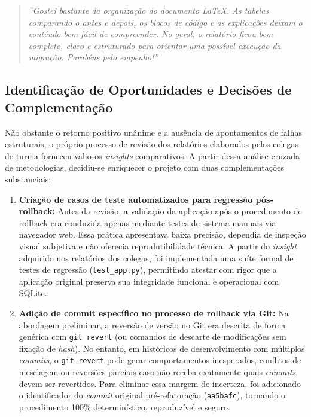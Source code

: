 \documentclass[12pt,a4paper]{article}
\begin{document}
\begin{quote}
\textit{``Gostei bastante da organização do documento LaTeX. As tabelas comparando o
antes e depois, os blocos de código e as explicações deixam o contéudo bem fácil de
compreender. No geral, o relatório ficou bem completo, claro e estruturado para
orientar uma possível execução da migração. Parabéns pelo empenho!''}
\end{quote}

\subsection{Identificação de Oportunidades e Decisões de Complementação}

Não obstante o retorno positivo unânime e a ausência de apontamentos de falhas estruturais,
o próprio processo de revisão dos relatórios elaborados pelos colegas de turma forneceu
valiosos \textit{insights} comparativos. A partir dessa análise cruzada de metodologias,
decidiu-se enriquecer o projeto com duas complementações substanciais:

\begin{enumerate}
  \item \textbf{Criação de casos de teste automatizados para regressão pós-rollback:}
        Antes da revisão, a validação da aplicação após o procedimento de rollback era
        conduzida apenas mediante testes de sistema manuais via navegador web. Essa
        prática apresentava baixa precisão, dependia de inspeção visual subjetiva e não
        oferecia reprodutibilidade técnica. A partir do \textit{insight} adquirido nos
        relatórios dos colegas, foi implementada uma suíte formal de testes de regressão
        (\texttt{test\_app.py}), permitindo atestar com rigor que a aplicação original
        preserva sua integridade funcional e operacional com SQLite.
  \item \textbf{Adição de commit específico no processo de rollback via Git:}
        Na abordagem preliminar, a reversão de versão no Git era descrita de forma genérica
        com \texttt{git revert} (ou comandos de descarte de modificações sem fixação
        de \textit{hash}). No entanto, em históricos de desenvolvimento com múltiplos
        \textit{commits}, o \texttt{git revert} pode gerar comportamentos inesperados,
        conflitos de mesclagem ou reversões parciais caso não receba exatamente quais
        \textit{commits} devem ser revertidos. Para eliminar essa margem de incerteza,
        foi adicionado o identificador do \textit{commit} original pré-refatoração
        (\texttt{aa5bafc}), tornando o procedimento 100\% determinístico, reproduzível
        e seguro.
\end{enumerate}
\end{document}
